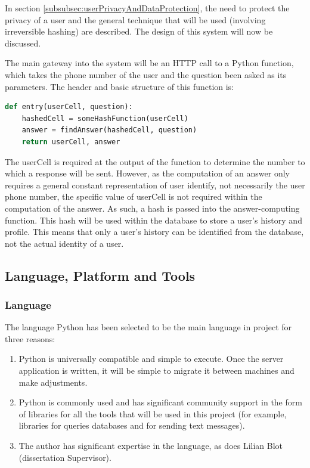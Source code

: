 \documentclass{article}
\begin{document}
In section \ref{subsubsec:userPrivacyAndDataProtection}, the need to protect the privacy of a user and the general technique that will be used (involving irreversible hashing) are described.  The design of this system will now be discussed.

The main gateway into the system will be an HTTP call to a Python function, which takes the phone number of the user and the question been asked as its parameters.  The header and basic structure of this function is:

\begin{lstlisting}[language=Python]
def entry(userCell, question):
    hashedCell = someHashFunction(userCell)
    answer = findAnswer(hashedCell, question)
    return userCell, answer
\end{lstlisting}

The userCell is required at the output of the function to determine the number to which a response will be sent.  However, as the computation of an answer only requires a general constant representation of user identify, not necessarily the user phone number, the specific value of userCell is not required within the computation of the answer.  As such, a hash is passed into the answer-computing function.  This hash will be used within the database to store a user's history and profile.  This means that only a user's history can be identified from the database, not the actual identity of a user.

\subsection{Language, Platform and Tools}
\subsubsection{Language}
The language Python has been selected to be the main language in project for three reasons:
\begin{enumerate}
  \item Python is universally compatible and simple to execute.  Once the server application is written, it will be simple to migrate it between machines and make adjustments.
  \item Python is commonly used and has significant community support in the form of libraries for all the tools that will be used in this project (for example, libraries for queries databases and for sending text messages).
  \item The author has significant expertise in the language, as does Lilian Blot (dissertation Supervisor).
\end{enumerate}
\end{document}
